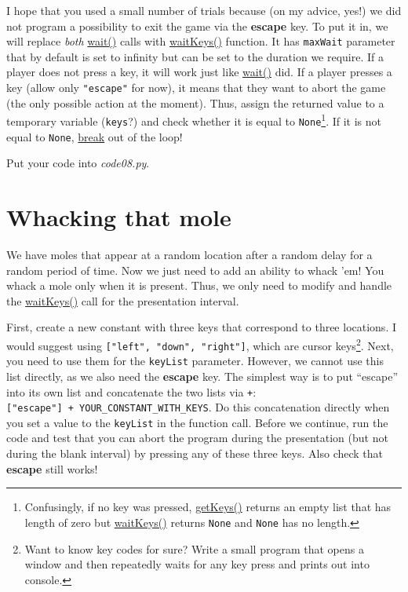 \documentclass[
]{book}
\begin{document}
I hope that you used a small number of trials because (on my advice, yes!) we did not program a possibility to exit the game via the \textbf{escape} key. To put it in, we will replace \emph{both} \href{https://psychopy.org/api/clock.html\#psychopy.clock.wait}{wait()} calls with \href{https://psychopy.org/api/event.html\#psychopy.event.waitKeys}{waitKeys()} function. It has \texttt{maxWait} parameter that by default is set to infinity but can be set to the duration we require. If a player does not press a key, it will work just like \href{https://psychopy.org/api/clock.html\#psychopy.clock.wait}{wait()} did. If a player presses a key (allow only \texttt{"escape"} for now), it means that they want to abort the game (the only possible action at the moment). Thus, assign the returned value to a temporary variable (\texttt{keys}?) and check whether it is equal to \texttt{None}\footnote{Confusingly, if no key was pressed, \href{https://psychopy.org/api/event.html\#psychopy.event.getKeys}{getKeys()} returns an empty list that has length of zero but \href{https://psychopy.org/api/event.html\#psychopy.event.waitKeys}{waitKeys()} returns \texttt{None} and \texttt{None} has no length.}. If it is not equal to \texttt{None}, \protect\hyperlink{break}{break} out of the loop!

Put your code into \emph{code08.py}.

\hypertarget{whacking-that-mole}{%
\section{Whacking that mole}\label{whacking-that-mole}}

We have moles that appear at a random location after a random delay for a random period of time. Now we just need to add an ability to whack 'em! You whack a mole only when it is present. Thus, we only need to modify and handle the \href{https://psychopy.org/api/event.html\#psychopy.event.waitKeys}{waitKeys()} call for the presentation interval.

First, create a new constant with three keys that correspond to three locations. I would suggest using \texttt{{[}"left",\ "down",\ "right"{]}}, which are cursor keys\footnote{Want to know key codes for sure? Write a small program that opens a window and then repeatedly waits for any key press and prints out into console.}. Next, you need to use them for the \texttt{keyList} parameter. However, we cannot use this list directly, as we also need the \textbf{escape} key. The simplest way is to put ``escape'' into its own list and concatenate the two lists via \texttt{+}: \texttt{{[}"escape"{]}\ +\ YOUR\_CONSTANT\_WITH\_KEYS}. Do this concatenation directly when you set a value to the \texttt{keyList} in the function call. Before we continue, run the code and test that you can abort the program during the presentation (but not during the blank interval) by pressing any of these three keys. Also check that \textbf{escape} still works!
\end{document}
